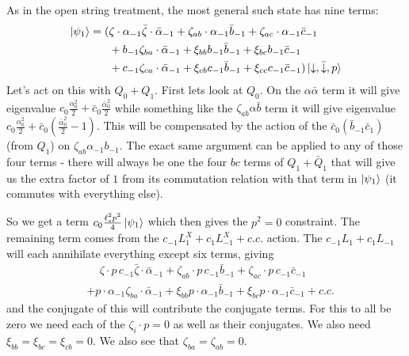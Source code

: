 \documentclass[11pt, class=article, crop=false]{standalone}
\begin{document}
\begin{enumerate}
	  As in the open string treatment, the most general such state has nine terms:
	  \[
	  \begin{aligned}
	  		  	\ket{\psi_1} = (&\zeta \cdot \alpha_{-1} \bar \zeta \cdot \bar \alpha_{-1} + \zeta_{ab} \cdot \alpha_{-1} \bar b_{-1} + \zeta_{ac} \cdot \alpha_{-1} \bar c_{-1}\\
				&+b_{-1} \zeta_{ba} \cdot \bar \alpha_{-1} + \xi_{bb} b_{-1} \bar b_{-1} + \xi_{bc} b_{-1} \bar c_{-1}\\
				&+ c_{-1} \zeta_{ca}\cdot \bar \alpha_{-1} + \xi_{cb} c_{-1} \bar b_{-1} + \xi_{cc} c_{-1} \bar c_{-1}) \ket{\downarrow, \bar \downarrow, p}
	  \end{aligned}
	  \]
	  Let's act on this with $Q_0 + Q_1$. First lets look at $Q_0$. On the $\alpha \bar \alpha$ term it will give eigenvalue $c_0 \frac{\alpha_0^2}2 + \bar c_0 \frac{\bar \alpha_0^2}{2}$ while something like the $\zeta_{ab} \alpha \bar b$ term it will give eigenvalue $c_0\frac{\alpha_0^2}2 + \bar c_0 (\frac{\bar \alpha_0^2}2 - 1)$. This will be compensated by the action of the $\bar c_0 (\bar b_{-1} \bar c_1)$ (from $Q_1$) on $\zeta_{ab} \alpha_{-1} b_{-1}$. The exact same argument can be applied to any of those four terms - there will always be one the four $bc$ terms of $Q_1 + \bar Q_1$ that will give us the extra factor of $1$ from its commutation relation with that term in $\ket{\psi_1}$ (it commutes with everything else).
	  
	  So we get a term $c_0 \frac{\ell_s^2 p^2}{4} \ket{\psi_1}$ which then gives the $p^2 = 0$ constraint. The remaining term comes from the $c_{-1} L^X_{1} + c_1 L^X_{-1} + c.c.$ action. The $c_{-1} L_1 + c_1 L_{-1}$ will each annihilate everything except six terms, giving
	  \begin{equation}\label{eq:Q}
   	  \begin{aligned}
      	  	&\quad\, \zeta \cdot p \, c_{-1}  \bar \zeta \cdot \bar \alpha_{-1} + \zeta_{ab} \cdot p\, c_{-1} \bar b_{-1} + \zeta_{ac} \cdot p \, c_{-1} \bar c_{-1}  \\
   		& +p \cdot \alpha_{-1} \zeta_{ba} \cdot \bar \alpha_{-1}  + \xi_{bb} p \cdot \alpha_{-1} \bar b_{-1} + \xi_{bc} p \cdot \alpha_{-1} \bar c_{-1} + c.c.
   	  \end{aligned}
	  \end{equation}
	  and the conjugate of this will contribute the conjugate terms. For this to all be zero we need each of the $\zeta_i \cdot p = 0$ as well as their conjugates. We also need $\xi_{bb} = \xi_{bc} = \xi_{cb} = 0$. We also see that $\zeta_{ba} = \zeta_{ab} = 0$.
	  

\end{enumerate}
\end{document}
